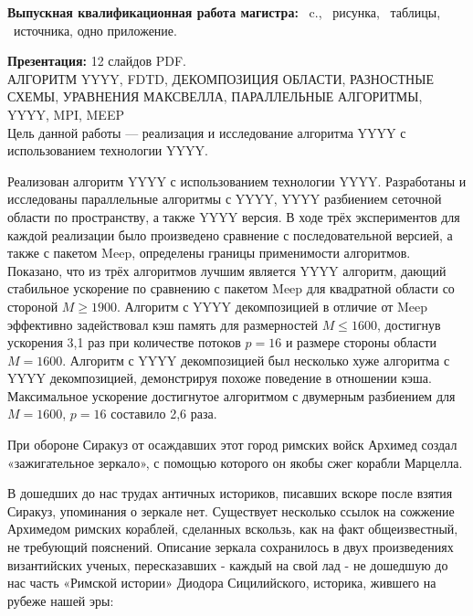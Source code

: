 \documentclass[14pt,a4paper]{extarticle} %
\begin{document}




\summarytitle


\textbf{Выпускная квалификационная работа магистра:} \totpages~c., \totfig~рисунка, \tottab~таблицы, \totbibref~источника, одно приложение. 



\textbf{Презентация:} 12 слайдов PDF.\\[30pt]


АЛГОРИТМ YYYY, FDTD, ДЕКОМПОЗИЦИЯ ОБЛАСТИ, РАЗНОСТНЫЕ СХЕМЫ, УРАВНЕНИЯ МАКСВЕЛЛА, ПАРАЛЛЕЛЬНЫЕ АЛГОРИТМЫ, YYYY, MPI, MEEP\\[30pt]

Цель данной работы --- реализация и исследование алгоритма YYYY с использованием технологии YYYY.

Реализован алгоритм YYYY  с использованием технологии YYYY. Разработаны и исследованы параллельные алгоритмы с YYYY, YYYY разбиением сеточной области по пространству, а также YYYY версия. В ходе трёх экспериментов для каждой реализации было произведено сравнение с последовательной версией, а также с пакетом Meep, определены границы применимости алгоритмов. Показано, что из трёх алгоритмов лучшим является YYYY алгоритм, дающий стабильное ускорение по сравнению с пакетом Meep для квадратной области со стороной $M \geqslant 1900$. Алгоритм с YYYY декомпозицией в отличие от Meep эффективно задействовал кэш память для размерностей $M \leqslant 1600$, достигнув ускорения 3,1 раз при количестве потоков $p = 16$ и размере стороны области $M = 1600$. Алгоритм с YYYY декомпозицией был несколько хуже алгоритма с YYYY декомпозицией, демонстрируя похоже поведение в отношении кэша. Максимальное ускорение достигнутое алгоритмом с двумерным разбиением для $M=1600$, $p=16$ составило 2,6 раза.

\newpage 
\tableofcontents

\introductiontitle

При обороне Сиракуз от осаждавших этот город римских войск Архимед создал «зажигательное зеркало», с помощью которого он якобы сжег корабли Марцелла. 

В дошедших до нас трудах античных историков, писавших вскоре после взятия Сиракуз, упоминания о зеркале нет. Существует несколько ссылок на сожжение Архимедом римских кораблей, сделанных вскользь, как на факт общеизвестный, не требующий пояснений. Описание зеркала сохранилось в двух произведениях византийских ученых, пересказавших - каждый на свой лад - не дошедшую до нас часть «Римской истории» Диодора Сицилийского, историка, жившего на рубеже нашей эры:
\end{document}
